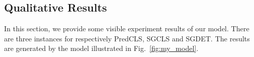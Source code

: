 \subsection{Qualitative Results}
In this section, we provide some visible experiment results of our model. There are three instances for respectively PredCLS, SGCLS and SGDET. The results are generated by the model illustrated in Fig.~\ref{fig:my_model}.

\begin{figure}[H]
	\centering
\end{figure}
